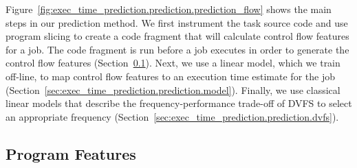 Figure~\ref{fig:exec_time_prediction.prediction.prediction_flow} shows the main
steps in our prediction method. We first instrument the task source code and
use program slicing to create a code fragment that will calculate control flow
features for a job. The code fragment is run before a job executes in order to
generate the control flow features
(Section~\ref{sec:exec_time_prediction.prediction.features}). Next, we use a
linear model, which we train off-line, to map control flow features to an
execution time estimate for the job
(Section~\ref{sec:exec_time_prediction.prediction.model}). Finally, we use
classical linear models \cite{xie-pldi03, wu-micro05} that describe the
frequency-performance trade-off of DVFS to select an appropriate frequency
(Section~\ref{sec:exec_time_prediction.prediction.dvfs}).

\subsection{Program Features}
\label{sec:exec_time_prediction.prediction.features}

